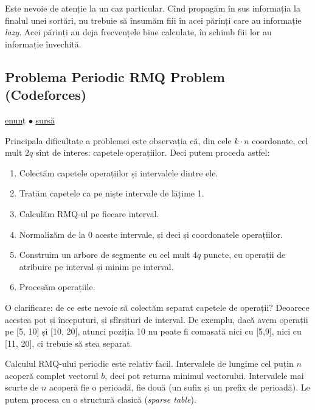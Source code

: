 \documentclass[../main.tex]{subfiles}
\begin{document}
Este nevoie de atenție la un caz particular. Cînd propagăm în sus informația la finalul unei sortări, nu trebuie să însumăm fiii în acei părinți care au informație \textit{lazy}. Acei părinți au deja frecvențele bine calculate, în schimb fiii lor au informație învechită.

\subsection{Problema Periodic RMQ Problem (Codeforces)}
\label{problem:periodic-rmq-problem}

\href{https://codeforces.com/contest/803/problem/G}{enunț}
$\bullet$
\hyperref[code:periodic-rmq-problem]{sursă}

Principala dificultate a problemei este observația că, din cele $k \cdot n$ coordonate, cel mult $2q$ sînt de interes: capetele operațiilor. Deci putem proceda astfel:

\begin{enumerate}
  \item Colectăm capetele operațiilor și intervalele dintre ele.

  \item Tratăm capetele ca pe niște intervale de lățime 1.

  \item Calculăm RMQ-ul pe fiecare interval.

  \item Normalizăm de la 0 aceste intervale, și deci și coordonatele operațiilor.

  \item Construim un arbore de segmente cu cel mult $4q$ puncte, cu operații de atribuire pe interval și minim pe interval.

  \item Procesăm operațiile.
\end{enumerate}

O clarificare: de ce este nevoie să colectăm separat capetele de operații? Deoarece acestea pot și începuturi, și sfîrșituri de interval. De exemplu, dacă avem operații pe [5, 10] și [10, 20], atunci poziția 10 nu poate fi comasată nici cu [5,9], nici cu [11, 20], ci trebuie să stea separat.

Calculul RMQ-ului periodic este relativ facil. Intervalele de lungime cel puțin $n$ acoperă complet vectorul $b$, deci pot returna minimul vectorului. Intervalele mai scurte de $n$ acoperă fie o perioadă, fie două (un sufix și un prefix de perioadă). Le putem procesa cu o structură clasică (\textit{sparse table}).
\end{document}
